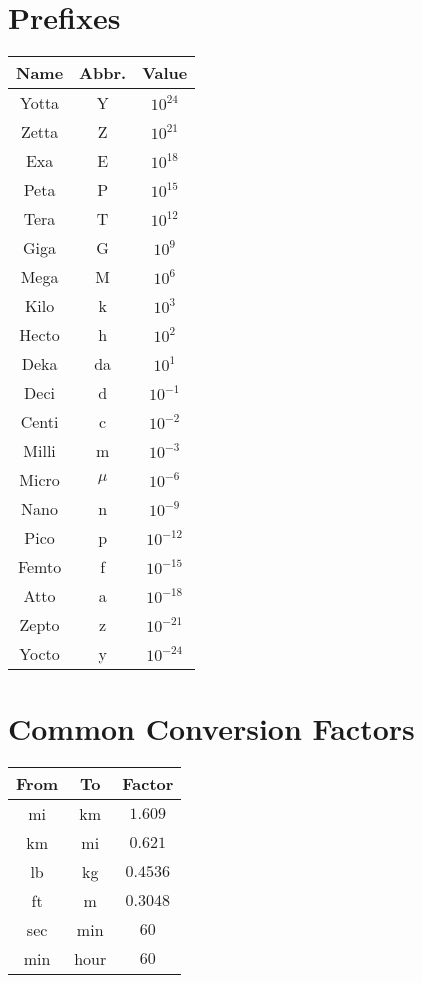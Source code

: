 \documentclass[15pt]{article}
\begin{document}
\section*{Prefixes}
\begin{tabular}{|c|c|c|}
    \hline
    Name & Abbr. & Value\\
    \hline
    Yotta & Y & $10^{24}$\\
    \hdashline
    Zetta & Z & $10^{21}$\\
    \hdashline
    Exa & E & $10^{18}$\\
    \hdashline
    Peta & P & $10^{15}$\\
    \hdashline
    Tera & T & $10^{12}$\\
    \hdashline
    Giga & G & $10^{9}$\\
    \hdashline
    Mega & M & $10^{6}$\\
    \hdashline
    Kilo & k & $10^{3}$\\
    \hdashline
    Hecto & h & $10^{2}$\\
    \hdashline
    Deka & da & $10^{1}$\\
    \hdashline
    Deci & d & $10^{-1}$\\
    \hdashline
    Centi & c & $10^{-2}$\\
    \hdashline
    Milli & m & $10^{-3}$\\
    \hdashline
    Micro & $\mu$ & $10^{-6}$\\
    \hdashline
    Nano & n & $10^{-9}$\\
    \hdashline
    Pico & p & $10^{-12}$\\
    \hdashline
    Femto & f & $10^{-15}$\\
    \hdashline
    Atto & a & $10^{-18}$\\
    \hdashline
    Zepto & z & $10^{-21}$\\
    \hdashline
    Yocto & y & $10^{-24}$\\
    \hline    
\end{tabular}

\section*{Common Conversion Factors}
\begin{tabular}{|c|c|c|}
    \hline
    From&To&Factor\\
    \hline
    mi&km&$1.609$\\
    \hdashline
    km&mi&$0.621$\\
    \hdashline
    lb&kg&$0.4536$\\
    \hdashline
    ft&m&$0.3048$\\
    \hdashline
    sec&min&$60$\\
    \hdashline
    min&hour&$60$\\
    \hline
\end{tabular}
\end{document}
